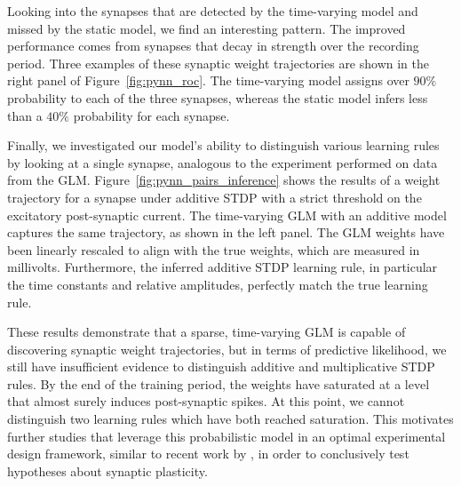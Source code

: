 Looking into the synapses that are detected by the time-varying model
and missed by the static model, we find an interesting pattern. The
improved performance comes from synapses that decay in strength over
the recording period. Three examples of these synaptic weight
trajectories are shown in the right panel of
Figure~\ref{fig:pynn_roc}. The time-varying model assigns over $90\%$
probability to each of the three synapses, whereas the static model
infers less than a $40\%$ probability for each synapse.

Finally, we investigated our model's ability to distinguish various
learning rules by looking at a single synapse, analogous to the
experiment performed on data from the
GLM. Figure~\ref{fig:pynn_pairs_inference} shows the results of a
weight trajectory for a synapse under additive STDP with a strict
threshold on the excitatory post-synaptic current. The time-varying GLM
with an additive model captures the same trajectory, as shown in the
left panel. The GLM weights have been linearly rescaled to align with
the true weights, which are measured in millivolts. Furthermore, the
inferred additive STDP learning rule, in particular the time constants
and relative amplitudes, perfectly match the true learning rule.

These results demonstrate that a sparse, time-varying GLM is capable
of discovering synaptic weight trajectories, but in terms of
predictive likelihood, we still have insufficient evidence to
distinguish additive and multiplicative STDP rules.
By the end of the training period, the weights have saturated at a
level that almost surely induces post-synaptic spikes. At this point,
we cannot distinguish two learning rules which have both reached
saturation.  This motivates further studies that leverage this
probabilistic model in an optimal experimental design framework,
similar to recent work by \citet{Shababo-2013}, in order to
conclusively test hypotheses about synaptic plasticity.

